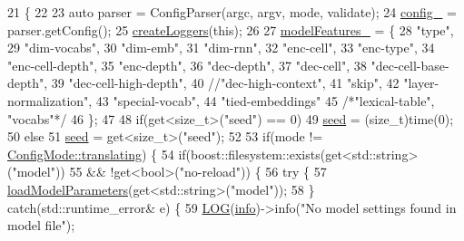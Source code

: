 \begin{DoxyCode}
21                                \{
22 
23     \textcolor{keyword}{auto} parser = ConfigParser(argc, argv, mode, validate);
24     \hyperlink{classmarian_1_1Config_acbe4dfabd18c2c561be60fa5adc28c3b}{config\_} = parser.getConfig();
25     \hyperlink{marian_2src_2common_2logging_8cpp_ac797ff0d4f04d8deeb12d6abef63d12d}{createLoggers}(\textcolor{keyword}{this});
26 
27     \hyperlink{classmarian_1_1Config_a63b2b2a9be247234930b5e2e55d97e11}{modelFeatures\_} = \{
28         \textcolor{stringliteral}{"type"},
29         \textcolor{stringliteral}{"dim-vocabs"},
30         \textcolor{stringliteral}{"dim-emb"},
31         \textcolor{stringliteral}{"dim-rnn"},
32         \textcolor{stringliteral}{"enc-cell"},
33         \textcolor{stringliteral}{"enc-type"},
34         \textcolor{stringliteral}{"enc-cell-depth"},
35         \textcolor{stringliteral}{"enc-depth"},
36         \textcolor{stringliteral}{"dec-depth"},
37         \textcolor{stringliteral}{"dec-cell"},
38         \textcolor{stringliteral}{"dec-cell-base-depth"},
39         \textcolor{stringliteral}{"dec-cell-high-depth"},
40         \textcolor{comment}{//"dec-high-context",}
41         \textcolor{stringliteral}{"skip"},
42         \textcolor{stringliteral}{"layer-normalization"},
43         \textcolor{stringliteral}{"special-vocab"},
44         \textcolor{stringliteral}{"tied-embeddings"}
45         \textcolor{comment}{/*"lexical-table", "vocabs"*/}
46     \};
47 
48     \textcolor{keywordflow}{if}(get<size\_t>(\textcolor{stringliteral}{"seed"}) == 0)
49       \hyperlink{classmarian_1_1Config_a5261277034b2e2268225bfbc32682cb4}{seed} = (size\_t)time(0);
50     \textcolor{keywordflow}{else}
51       \hyperlink{classmarian_1_1Config_a5261277034b2e2268225bfbc32682cb4}{seed} = get<size\_t>(\textcolor{stringliteral}{"seed"});
52 
53     \textcolor{keywordflow}{if}(mode != \hyperlink{namespacemarian_aaddd4b008ff5352b1fe7e16574f7e1f9a5143d2bebfe7a6b9c7050a8f6bf53e2b}{ConfigMode::translating}) \{
54       \textcolor{keywordflow}{if}(boost::filesystem::exists(get<std::string>(\textcolor{stringliteral}{"model"}))
55          && !get<bool>(\textcolor{stringliteral}{"no-reload"})) \{
56         \textcolor{keywordflow}{try} \{
57           \hyperlink{classmarian_1_1Config_a88b17725ec749ce6fa43e8722dbe0f7b}{loadModelParameters}(get<std::string>(\textcolor{stringliteral}{"model"}));
58         \} \textcolor{keywordflow}{catch}(std::runtime\_error& e) \{
59           \hyperlink{amun_2common_2logging_8h_a8cad147aca8c526d3c8a03ae14d5c87d}{LOG}(\hyperlink{namespacefix__hard_a31eedbb056537bc1bef47ad5e40eaa68}{info})->info(\textcolor{stringliteral}{"No model settings found in model file"});

\end{DoxyCode}
